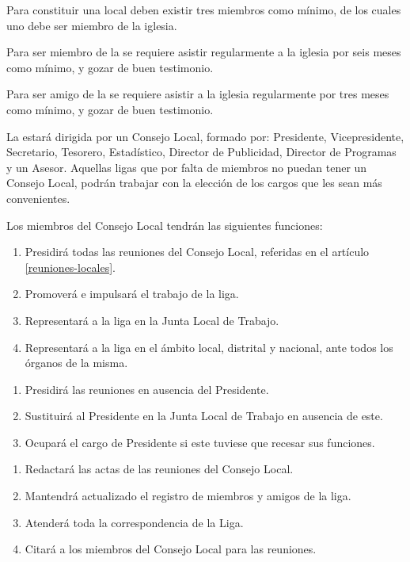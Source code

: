 

\article
Para constituir una \LMJ{} local deben existir tres miembros como mínimo, de los cuales uno debe ser miembro de la iglesia.

\article
\label{membresia-liga}
Para ser miembro de la \LMJ{} se requiere asistir regularmente a la iglesia por seis meses como mínimo, y gozar de buen testimonio.

\article
\label{amigo-liga}
Para ser amigo de la \LMJ{} se requiere asistir a la iglesia regularmente por tres meses como mínimo, y gozar de buen testimonio.

\article
La \LMJ{} estará dirigida por un Consejo Local, formado por: Presidente, Vicepresidente, Secretario, Tesorero, Estadístico, Director de Publicidad, Director de Programas y un Asesor.
Aquellas ligas que por falta de miembros no puedan tener un Consejo Local, podrán trabajar con la elección de los cargos que les sean más convenientes.

\article
Los miembros del Consejo Local tendrán las siguientes funciones:

\begin{enumerate}
    \item Presidirá todas las reuniones del Consejo Local, referidas en el artículo \ref{reuniones-locales}.
    \item Promoverá e impulsará el trabajo de la liga.
    \item Representará a la liga en la Junta Local de Trabajo.
    \item Representará a la liga en el ámbito local, distrital y nacional, ante todos los órganos de la misma.
\end{enumerate}

\begin{enumerate}
    \item Presidirá las reuniones en ausencia del Presidente.
    \item Sustituirá al Presidente en la Junta Local de Trabajo en ausencia de este.
    \item Ocupará el cargo de Presidente si este tuviese que recesar sus funciones.
\end{enumerate}

\begin{enumerate}
    \item Redactará las actas de las reuniones del Consejo Local.
    \item Mantendrá actualizado el registro de miembros y amigos de la liga.
    \item Atenderá toda la correspondencia de la Liga.
    \item Citará a los miembros del Consejo Local para las reuniones.
\end{enumerate}

